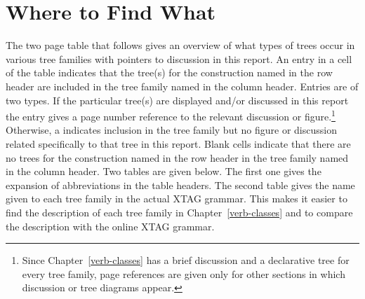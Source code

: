 \chapter{Where to Find What}
\label{table-intro}

The two page table that follows gives an overview of what types of
trees occur in various tree families with pointers to discussion in
this report.  An entry in a cell of the table indicates that the
tree(s) for the construction named in the row header are included in
the tree family named in the column header. Entries are of two types.
If the particular tree(s) are displayed and/or discussed in this
report the entry gives a page number reference to the relevant
discussion or figure.\footnote{Since Chapter~\ref{verb-classes} has a
  brief discussion and a declarative tree for every tree family, page
  references are given only for other sections in which discussion or
  tree diagrams appear.}  Otherwise, a \xtagcheck \space indicates
inclusion in the tree family but no figure or discussion related
specifically to that tree in this report.  Blank cells indicate that
there are no trees for the construction named in the row header in the
tree family named in the column header.  Two tables are given below.
The first one gives the expansion of abbreviations in the table
headers. The second table gives the name given to each tree family in
the actual XTAG grammar. This makes it easier to find the description
of each tree family in Chapter~\ref{verb-classes} and to compare the
description with the online XTAG grammar.

\vspace{0.3in}

